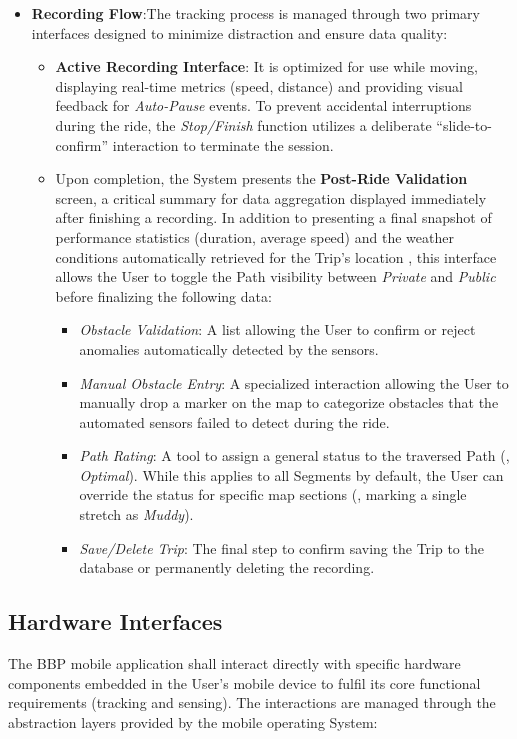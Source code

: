 \begin{itemize}
    \item \textbf{Recording Flow}:The tracking process is managed through two primary interfaces designed to minimize distraction and ensure data quality:
    \begin{itemize}
        \item \textbf{Active Recording Interface}: It is optimized for use while moving, displaying real-time metrics (speed, distance) and providing visual feedback for \emph{Auto-Pause} events. To prevent accidental interruptions during the ride, the \emph{Stop/Finish} function utilizes a deliberate ``slide-to-confirm'' interaction to terminate the session.
        \item Upon completion, the System presents the \textbf{Post-Ride Validation} screen, a critical summary for data aggregation displayed immediately after finishing a recording. In addition to presenting a final snapshot of performance statistics (duration, average speed) and the weather conditions automatically retrieved for the Trip's location , this interface allows the User to toggle the Path visibility between \emph{Private} and \emph{Public}  before finalizing the following data: 
        \begin{itemize} 
            \item \emph{Obstacle Validation}: A list allowing the User to confirm or reject anomalies automatically detected by the sensors. 
            \item \emph{Manual Obstacle Entry}: A specialized interaction allowing the User to manually drop a marker on the map to categorize obstacles that the automated sensors failed to detect during the ride.
            \item \emph{Path Rating}: A tool to assign a general status to the traversed Path (\eg, \emph{Optimal}). While this applies to all Segments by default, the User can override the status for specific map sections (\eg, marking a single stretch as \emph{Muddy}).
            \item \emph{Save/Delete Trip}: The final step to confirm saving the Trip to the database or permanently deleting the recording.
        \end{itemize}
    \end{itemize}
\end{itemize}

\subsection{Hardware Interfaces}
The BBP mobile application shall interact directly with specific hardware components embedded in the User's mobile device to fulfil its core functional requirements (tracking and sensing). The interactions are managed through the abstraction layers provided by the mobile operating System:

